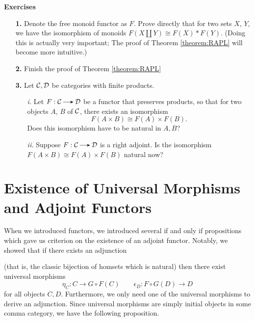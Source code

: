     {\large \textbf{Exercises}
    \vspace{0.2cm}}
    \begin{itemize}
        \item[\textbf{1.}] Denote the free monoid functor as $F$.
        Prove directly that for two sets $X$, $Y$, we have 
        the isomorphism of monoids $F(X \amalg Y) \cong F(X) * F(Y)$. (Doing this is actually very important; 
        The proof of Theorem \ref{theorem:RAPL} will become more intuitive.)
        \item[\textbf{2.}] Finish the proof of Theorem \ref{theorem:RAPL}
        \item[\textbf{3.}] 
        Let $\mathcal{C}, \mathcal{D}$ be categories with finite products. 
        \begin{itemize}
            \item[\emph{i.}] Let $F: \cc \to \dd$ be a functor that preserves products, so that
            for two objects $A$, $B$ of $\mathcal{C}$, there exists an isomorphism 
            \[
                F(A \times B) \cong F(A) \times F(B).
            \]
            Does this isomorphism have to be natural in $A, B$?

            \item[\emph{ii.}] Suppose $F: \cc \to \dd$ is a right adjoint. Is the isomorphism 
            $F(A \times B) \cong F(A) \times F(B)$ natural now? 
        \end{itemize}
    \end{itemize}


    

    \newpage 
    \section{Existence of Universal Morphisms and Adjoint Functors}
    When we introduced functors, we introduced several if and only 
    if propositions which gave us criterion on the existence of an adjoint 
    functor. Notably, we showed that if there exists an adjunction 
    \begin{center}
    \end{center}
    (that is, the classic bijection of homsets which is natural)
    then there exist universal morphisms 
    \[
        \eta_C: C \to G \circ F(C) \qquad \epsilon_D: F\circ G(D) \to D 
    \]
    for all objects $C, D$. Furthermore, we only need one of the universal morphisms 
    to derive an adjunction. Since universal morphisms are simply initial objects 
    in some comma category, we have the following proposition. 


